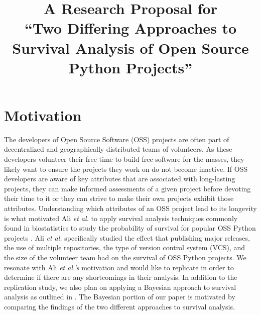 \documentclass[conference]{IEEEtran}
\begin{document}


\title{A Research Proposal for \\``Two Differing Approaches to Survival Analysis of Open Source Python Projects''}

\author{
}

\maketitle

\section{Motivation}

The developers of Open Source Software (OSS) projects are often part of decentralized and geographically distributed teams of volunteers. As these developers volunteer their free time to build free software for the masses, they likely want to ensure the projects they work on do not become inactive. If OSS developers are aware of key attributes that are associated with long-lasting projects, they can make informed assessments of a given project before devoting their time to it or they can strive to make their own projects exhibit those attributes. Understanding which attributes of an OSS project lead to its longevity is what motivated Ali \emph{et al.} to apply survival analysis techniques commonly found in biostatistics to study the probability of survival for popular OSS Python projects \cite{ali2020cheating}. Ali \emph{et al.} specifically studied the effect that publishing major releases, the use of multiple repositories, the type of version control system (VCS), and the size of the volunteer team had on the survival of OSS Python projects. We resonate with Ali \emph{et al.'s} motivation and would like to replicate \cite{ali2020cheating} in order to determine if there are any shortcomings in their analysis. In addition to the replication study, we also plan on applying a Bayesian approach to survival analysis as outlined in \cite{kelter2020bayesian}. The Bayesian portion of our paper is motivated by comparing the findings of the two different approaches to survival analysis.
\end{document}
